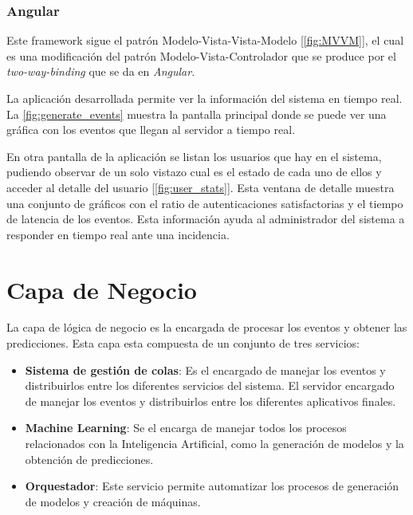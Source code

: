 \subsubsection{Angular}
\label{sec:system:web_admin:angular}

Este framework sigue el patrón Modelo-Vista-Vista-Modelo [\cref{fig:MVVM}], el cual es una modificación del patrón Modelo-Vista-Controlador que se produce por el \textit{two-way-binding} que se da en \textit{Angular}.



La aplicación desarrollada permite ver la información del sistema en tiempo real. La \cref{fig:generate_events} muestra la pantalla principal donde se puede ver una gráfica con los eventos que llegan al servidor a tiempo real.



En otra pantalla de la aplicación se listan los usuarios que hay en el sistema, pudiendo observar de un solo vistazo cual es el estado de cada uno de ellos y acceder al detalle del usuario [\cref{fig:user_stats}]. Esta ventana de detalle muestra una conjunto de gráficos con el ratio de autenticaciones satisfactorias y el tiempo de latencia de los eventos. Esta información ayuda al administrador del sistema a responder en tiempo real ante una incidencia.


\section{Capa de Negocio}
La capa de lógica de negocio es la encargada de procesar los eventos y obtener las predicciones. Esta capa esta compuesta de un conjunto de tres servicios:

\begin{itemize}[noitemsep]
    \item \textbf{Sistema de gestión de colas}: Es el encargado de manejar los eventos y distribuirlos entre los diferentes servicios del sistema.
          El servidor encargado de manejar los eventos y distribuirlos entre los diferentes aplicativos finales.
    \item \textbf{Machine Learning}: Se el encarga de manejar todos los procesos relacionados con la Inteligencia Artificial, como la generación de modelos y la obtención de predicciones.
    \item \textbf{Orquestador}: Este servicio permite automatizar los procesos de generación de modelos y creación de máquinas.
\end{itemize}

